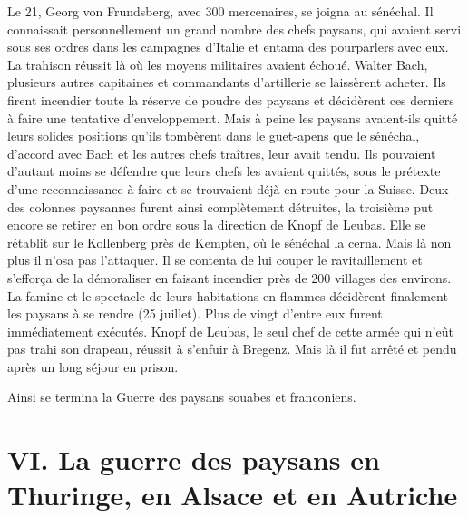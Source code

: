 \documentclass[french,twoside]{book} %
\newcommand\chapteropen{} %
\newcommand\chapterclose{} %
\begin{document}
Le 21, Georg von Frundsberg, avec 300 mercenaires, se joigna au sénéchal. Il connaissait personnellement un grand nombre des chefs paysans, qui avaient servi sous ses ordres dans les campagnes d’Italie et entama des pourparlers avec eux. La trahison réussit là où les moyens militaires avaient échoué. Walter Bach, plusieurs autres capitaines et commandants d’artillerie se laissèrent acheter. Ils firent incendier toute la réserve de poudre des paysans et décidèrent ces derniers à faire une tentative d’enveloppement. Mais à peine les paysans avaient-ils quitté leurs solides positions qu’ils tombèrent dans le guet-apens que le sénéchal, d’accord avec Bach et les autres chefs traîtres, leur avait tendu. Ils pouvaient d’autant moins se défendre que leurs chefs les avaient quittés, sous le prétexte d’une reconnaissance à faire et se trouvaient déjà en route pour la Suisse. Deux des colonnes paysannes furent ainsi complètement détruites, la troisième put encore se retirer en bon ordre sous la direction de Knopf de Leubas. Elle se rétablit sur le Kollenberg près de Kempten, où le sénéchal la cerna. Mais là non plus il n’osa pas l’attaquer. Il se contenta de lui couper le ravitaillement et s’efforça de la démoraliser en faisant incendier près de 200 villages des environs. La famine et le spectacle de leurs habitations en flammes décidèrent finalement les paysans à se rendre (25 juillet). Plus de vingt d’entre eux furent immédiatement exécutés. Knopf de Leubas, le seul chef de cette armée qui n’eût pas trahi son drapeau, réussit à s’enfuir à Bregenz. Mais là il fut arrêté et pendu après un long séjour en prison.\par
Ainsi se termina la Guerre des paysans souabes et franconiens.
\chapterclose


\chapteropen
\renewcommand{\leftmark}{VI. La guerre des paysans en Thuringe, en Alsace et en Autriche}
\chapter[VI. La guerre des paysans en Thuringe, en Alsace et en Autriche]{VI. La guerre des paysans en Thuringe, en Alsace et en Autriche}
\end{document}

